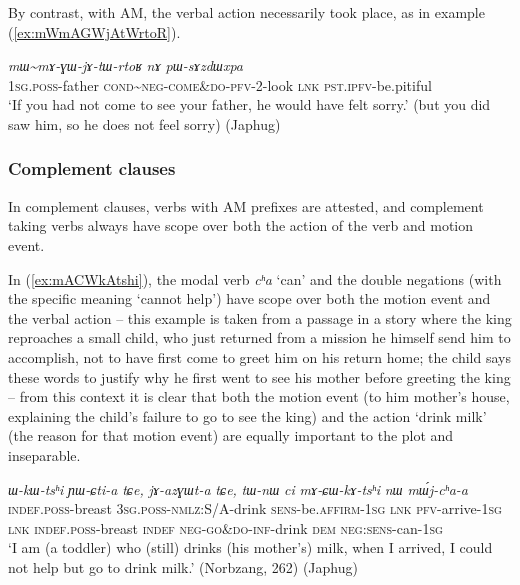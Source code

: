 \documentclass[oneside,a4paper,11pt]{article}
\newcommand{\ipa}[1]{{\phon\textit{#1}}}
\newcommand{\japhug}[2]{\textit{\phon#1} `#2'}
\newcommand{\redp}{\textasciitilde}
\newcommand{\rouge}[1]{{\color{red}#1}}
\begin{document}
By contrast, with AM, the verbal action necessarily took place, as in example (\ref{ex:mWmAGWjAtWrtoR}).

\begin{exe}
\ex \label{ex:mWmAGWjAtWrtoR}
\gll \ipa{nɤ-wa}	\ipa{mɯ\redp{}mɤ-\rouge{ɣɯ}-jɤ-tɯ-rtoʁ}	\ipa{nɤ}	\ipa{pɯ-sɤzdɯxpa} \\
\textsc{1sg.poss}-father \textsc{cond}\redp{}\textsc{neg}-\rouge{\textsc{come\&do}}-\textsc{pfv}-2-look \textsc{lnk} \textsc{pst.ipfv}-be.pitiful \\ 
\glt `If you had not come to see your father, he would have felt sorry.' (but you did saw him, so he does not feel sorry) (Japhug)
\end{exe}

\subsubsection{Complement clauses} \label{sec:am.complement}
In complement clauses, verbs with AM prefixes are attested, and complement taking verbs always have scope over both the action of the verb and motion event.

 
In (\ref{ex:mACWkAtshi}), the modal verb \japhug{cʰa}{can} and the double negations (with the specific meaning `cannot help') have scope over both the motion event and the verbal action -- this example is taken from a passage in a story where the king reproaches a small child, who just returned from a mission he himself send him to accomplish, not to have first come to greet him on his return home; the child says these words to justify why he first went to see his mother before greeting the king -- from this context it is clear that both the motion event (to him mother's house, explaining the child's failure to go to see the king) and the action `drink milk' (the reason for that motion event) are equally important to the plot and inseparable. 

\begin{exe}
\ex \label{ex:mACWkAtshi}
\gll  \ipa{tɯ-nɯ}	\ipa{ɯ-kɯ-tsʰi}	\ipa{ɲɯ-ɕti-a}	\ipa{tɕe,}	\ipa{jɤ-azɣɯt-a}	\ipa{tɕe,}	\ipa{tɯ-nɯ}	\ipa{ci}	\ipa{mɤ-\rouge{ɕɯ}-kɤ-tsʰi}	\ipa{nɯ}	\ipa{mɯ́j-cʰa-a}  \\
\textsc{indef}.\textsc{poss}-breast \textsc{3sg}.\textsc{poss}-\textsc{nmlz}:S/A-drink \textsc{sens}-be.\textsc{affirm}-\textsc{1sg} \textsc{lnk} \textsc{pfv}-arrive-\textsc{1sg} \textsc{lnk} \textsc{indef}.\textsc{poss}-breast  \textsc{indef} \textsc{neg}-\rouge{\textsc{go\&do}}-\textsc{inf}-drink \textsc{dem} \textsc{neg}:\textsc{sens}-can-\textsc{1sg} \\
\glt `I am (a toddler) who (still) drinks (his mother's) milk, when I arrived, I could not help but go to drink milk.'  (Norbzang, 262) (Japhug)
 \end{exe}
 
\end{document}
